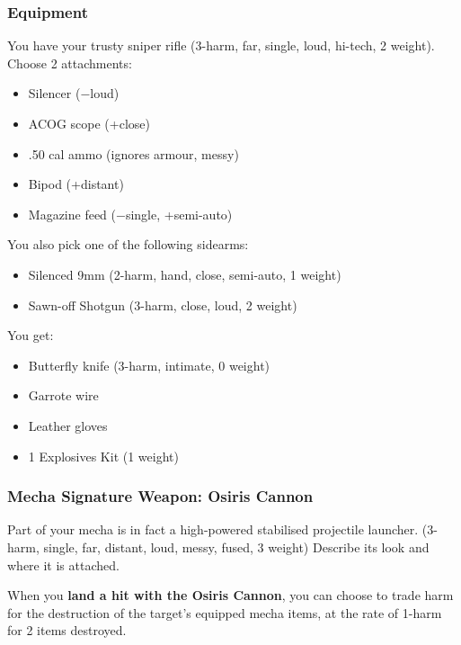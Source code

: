 
\subsubsection{Equipment}

You have your trusty sniper rifle (3-harm, far, single, loud, hi-tech, 2 weight). Choose 2 attachments:
\begin{itemize}
\item Silencer ($-$loud)
\item ACOG scope (+close)
\item .50 cal ammo (ignores armour, messy)
\item Bipod (+distant)
\item Magazine feed ($-$single, +semi-auto)
\end{itemize}

You also pick one of the following sidearms:
\begin{itemize}
\item Silenced 9mm (2-harm, hand, close, semi-auto, 1 weight)
\item Sawn-off Shotgun (3-harm, close, loud, 2 weight)
\end{itemize}

You get:
\begin{itemize}
\item Butterfly knife (3-harm, intimate, 0 weight)
\item Garrote wire
\item Leather gloves
\item 1 Explosives Kit (1 weight)
\end{itemize}

\subsubsection{Mecha Signature Weapon: Osiris Cannon}
Part of your mecha is in fact a high-powered stabilised projectile launcher. (3-harm, single, far, distant, loud, messy, fused, 3 weight) Describe its look and where it is attached.

When you \textbf{land a hit with the Osiris Cannon}, you can choose to trade harm for the destruction of the target's equipped mecha items, at the rate of 1-harm for 2 items destroyed.




